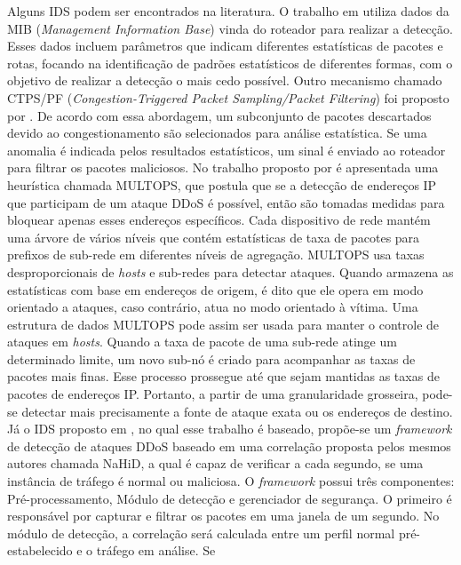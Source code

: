 Alguns IDS podem ser encontrados na literatura. O trabalho em \cite{cabrera2001proactive} utiliza dados da MIB (\textit{Management Information Base}) vinda do roteador para realizar a detecção. Esses dados incluem parâmetros que indicam diferentes estatísticas de pacotes e rotas, focando na identificação de padrões estatísticos de diferentes formas, com o objetivo de realizar a detecção o mais cedo possível. Outro mecanismo chamado CTPS/PF (\textit{Congestion-Triggered Packet Sampling/Packet Filtering}) foi proposto por \cite{huang2001countering}. De acordo com essa abordagem, um subconjunto de pacotes descartados devido ao congestionamento são selecionados para análise estatística. Se uma anomalia é indicada pelos resultados estatísticos, um sinal é enviado ao roteador para filtrar os pacotes maliciosos. No trabalho proposto por  é apresentada uma heurística chamada MULTOPS, que postula que se a detecção de endereços IP que participam de um ataque DDoS é possível, então são tomadas medidas para bloquear apenas esses endereços específicos. Cada dispositivo de rede mantém uma árvore de vários níveis que contém estatísticas de taxa de pacotes para prefixos de sub-rede em diferentes níveis de agregação. MULTOPS usa taxas desproporcionais de \textit{hosts} e sub-redes para detectar ataques. Quando armazena as estatísticas com base em endereços de origem, é dito que ele opera em modo orientado a ataques, caso contrário, atua no modo orientado à vítima. Uma estrutura de dados MULTOPS pode assim ser usada para manter o controle de ataques em \textit{hosts}. Quando a taxa de pacote de uma sub-rede atinge um determinado limite, um novo sub-nó é criado para acompanhar as taxas de pacotes mais finas. Esse processo prossegue até que sejam mantidas as taxas de pacotes de endereços IP. Portanto, a partir de uma granularidade grosseira, pode-se detectar mais precisamente a fonte de ataque exata ou os endereços de destino. Já o IDS proposto em , no qual esse trabalho é baseado,  propõe-se um \textit{framework} de detecção de ataques DDoS baseado em uma correlação proposta pelos mesmos autores chamada NaHiD, a qual é capaz de verificar a cada segundo, se uma instância de tráfego é normal ou maliciosa. O \textit{framework} possui três componentes: Pré-processamento, Módulo de detecção e gerenciador de segurança. O primeiro é responsável por capturar e filtrar os pacotes em uma janela de um segundo. No módulo de detecção, a correlação será calculada entre um perfil normal pré-estabelecido e o tráfego  em análise. Se 
